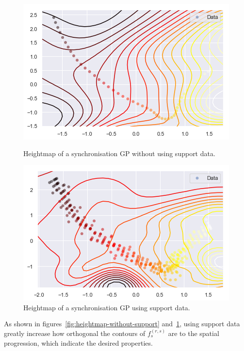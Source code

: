 \begin{figure}[H]
  \begin{minipage}{.46\textwidth}
    \includegraphics[scale=0.48,width=\textwidth]{figures/heat-without-support-data.png}
    \caption{Heightmap of a synchronisation GP without using support data.}
    \label{fig:heightmap-without-support}
  \end{minipage}
  \hspace{5pt}
  \begin{minipage}{.46\textwidth}
    \includegraphics[scale=0.5,width=\textwidth]{figures/heat-with-support-data.png}
    \caption{Heightmap of a synchronisation GP using support data.}
    \label{fig:heightmap-with-support}
  \end{minipage}
\end{figure}

\noindent
As shown in figures~\ref{fig:heightmap-without-support} and~\ref{fig:heightmap-with-support}, using support data greatly increase how orthogonal the contours of $f^{(r,s)}_s$ are to the spatial progression, which indicate the desired properties.

